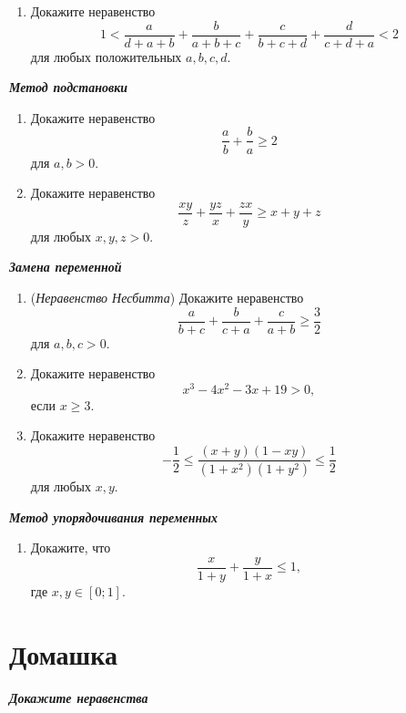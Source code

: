 \documentclass[a4paper,12pt,leqno]{article}
\begin{document}
	\begin{enumerate}
		\item[\z] Докажите неравенство $$1 < \frac{a}{d + a + b} + \frac{b}{a + b + c} +\frac{c}{b+c+d} + \frac{d}{c+d+a} < 2$$
		для любых положительных $a, b, c, d$.
	\end{enumerate}
	
	\textbf{\textit{Метод подстановки}}
	
	\begin{enumerate}
		\item[\z] Докажите неравенство $$\frac{a}{b} + \frac{b}{a} \geqslant 2$$ для $a, b > 0.$
		
		\item[\z] Докажите неравенство $$\frac{xy}{z} + \frac{yz}{x} + \frac{zx}{y} \geqslant x + y + z$$ для любых $x, y, z > 0$.
	\end{enumerate}
	
	\textbf{\textit{Замена переменной}}
	
	\begin{enumerate}
		\item[\z] (\textit{Неравенство Несбитта}) Докажите неравенство $$\frac{a}{b+c} + \frac{b}{c+a} + \frac{c}{a+b} \geqslant \frac{3}{2}$$
		для $a, b, c > 0$.
		
		\item[\z] Докажите неравенство $$x^3 -4x^2-3x+19 > 0 ,$$
		если $x \geqslant 3$.
		
		\item[\z] Докажите неравенство $$-\frac{1}{2} \leqslant \frac{(x+y)(1-xy)}{(1+x^2)(1+y^2)}\leqslant \frac{1}{2}$$
		для любых $x, y$.
	\end{enumerate}
	\newpage
	\textbf{\textit{Метод упорядочивания переменных}}
	
	\begin{enumerate}
		\item[\z] Докажите, что $$\frac{x}{1+y} + \frac{y}{1+x} \leqslant 1 ,$$ где $x, y \in [0; 1].$ 
	\end{enumerate}
	
	\section*{Домашка}
	\textbf{\textit{Докажите неравенства}}
	
	\newcommand{\ner}[1]{\item[\z] #1}
	
\end{document}
